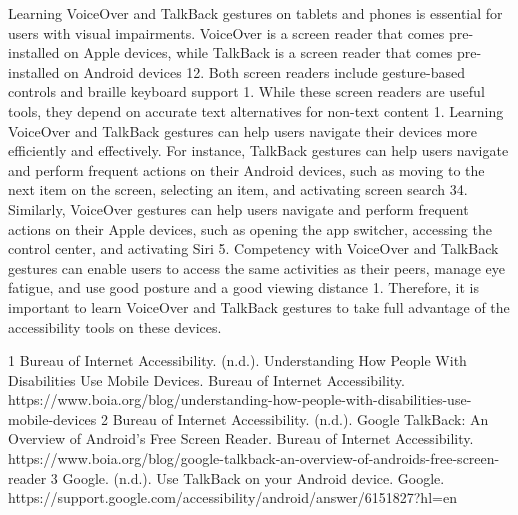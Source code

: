 Learning VoiceOver and TalkBack gestures on tablets and phones is essential for users with visual impairments. VoiceOver is a screen reader that comes pre-installed on Apple devices, while TalkBack is a screen reader that comes pre-installed on Android devices 12. Both screen readers include gesture-based controls and braille keyboard support 1. While these screen readers are useful tools, they depend on accurate text alternatives for non-text content 1. Learning VoiceOver and TalkBack gestures can help users navigate their devices more efficiently and effectively. For instance, TalkBack gestures can help users navigate and perform frequent actions on their Android devices, such as moving to the next item on the screen, selecting an item, and activating screen search 34. Similarly, VoiceOver gestures can help users navigate and perform frequent actions on their Apple devices, such as opening the app switcher, accessing the control center, and activating Siri 5. Competency with VoiceOver and TalkBack gestures can enable users to access the same activities as their peers, manage eye fatigue, and use good posture and a good viewing distance 1. Therefore, it is important to learn VoiceOver and TalkBack gestures to take full advantage of the accessibility tools on these devices.

1 Bureau of Internet Accessibility. (n.d.). Understanding How People With Disabilities Use Mobile Devices. Bureau of Internet Accessibility. https://www.boia.org/blog/understanding-how-people-with-disabilities-use-mobile-devices
2 Bureau of Internet Accessibility. (n.d.). Google TalkBack: An Overview of Android’s Free Screen Reader. Bureau of Internet Accessibility. https://www.boia.org/blog/google-talkback-an-overview-of-androids-free-screen-reader
3 Google. (n.d.). Use TalkBack on your Android device. Google. https://support.google.com/accessibility/android/answer/6151827?hl=en


